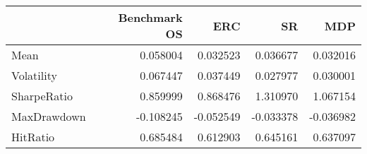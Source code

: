 \begin{tabular}{lrrrr}
\toprule
{} &  Benchmark OS &       ERC &        SR &       MDP \\
\midrule
Mean        &      0.058004 &  0.032523 &  0.036677 &  0.032016 \\
Volatility  &      0.067447 &  0.037449 &  0.027977 &  0.030001 \\
SharpeRatio &      0.859999 &  0.868476 &  1.310970 &  1.067154 \\
MaxDrawdown &     -0.108245 & -0.052549 & -0.033378 & -0.036982 \\
HitRatio    &      0.685484 &  0.612903 &  0.645161 &  0.637097 \\
\bottomrule
\end{tabular}
